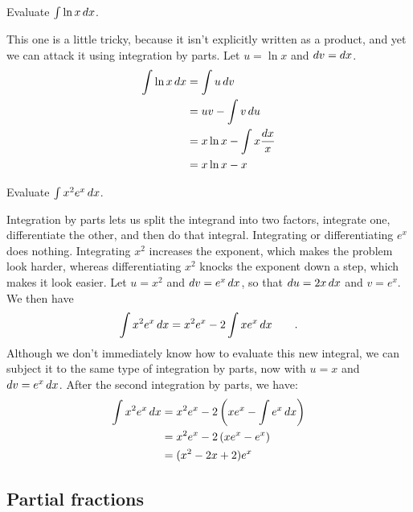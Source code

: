 \begin{eg}
\egquestion Evaluate $\int \ln x \mathop{d\!} x$.

\eganswer This one is a little tricky, because it isn't explicitly
written as a product, and yet we can attack it using integration by
parts. Let $u=\ln x$ and $\mathop{d\!} v=\mathop{d\!} x$.
\begin{align*}
  \int \ln x \mathop{d\!} x &= \int u \mathop{d\!} v \\
                       &= uv - \int v \mathop{d\!} u \\
                       &= x\ln x-\int x \frac{\mathop{d\!} x}{x} \\
                       &= x\ln x-x
\end{align*}
\end{eg}

\begin{eg}\label{eg:integrate-x-squared-times-exp}
\egquestion Evaluate $\int x^2 e^x \mathop{d\!} x$.

\eganswer
Integration by parts lets us split the integrand into two factors, integrate one, differentiate the
other, and then do that integral. Integrating or differentiating $e^x$ does nothing. Integrating
$x^2$ increases the exponent, which makes the problem look harder, whereas differentiating $x^2$
knocks the exponent down a step, which makes it look easier. Let $u=x^2$ and $\mathop{d\!} v=e^x \mathop{d\!} x$,
so that $\mathop{d\!} u=2x\mathop{d\!} x$ and $v=e^x$. We then have
\begin{equation*}
  \int x^2 e^x \mathop{d\!} x = x^2 e^x - 2 \int x e^x\mathop{d\!} x \qquad .
\end{equation*}
Although we don't immediately know how to evaluate this new integral, we can subject it to the
same type of integration by parts, now with $u=x$ and $\mathop{d\!} v=e^x \mathop{d\!} x$. After the second
integration by parts, we have:
\begin{align*}
  \int x^2 e^x \mathop{d\!} x &= x^2 e^x - 2 \left(x e^x -\int e^x\mathop{d\!} x \right) \\
                        &= x^2 e^x - 2 \left(x e^x - e^x \right) \\
                        &= (x^2-2x+2)e^x \\
\end{align*}
\end{eg}

\subsection{Partial fractions}

